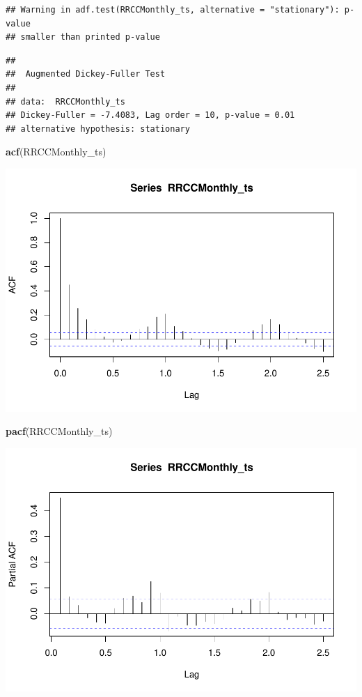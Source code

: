 \documentclass[12pt,]{article}
\newenvironment{Shaded}{\begin{snugshade}}{\end{snugshade}}
\newcommand{\KeywordTok}[1]{\textcolor[rgb]{0.13,0.29,0.53}{\textbf{#1}}}
\newcommand{\NormalTok}[1]{#1}
\begin{document}
\begin{verbatim}
## Warning in adf.test(RRCCMonthly_ts, alternative = "stationary"): p-value
## smaller than printed p-value
\end{verbatim}

\begin{verbatim}
## 
##  Augmented Dickey-Fuller Test
## 
## data:  RRCCMonthly_ts
## Dickey-Fuller = -7.4083, Lag order = 10, p-value = 0.01
## alternative hypothesis: stationary
\end{verbatim}

\begin{Shaded}
\begin{Highlighting}[]
\KeywordTok{acf}\NormalTok{(RRCCMonthly_ts)}
\end{Highlighting}
\end{Shaded}

\includegraphics{Project_Template_files/figure-latex/unnamed-chunk-6-23.pdf}

\begin{Shaded}
\begin{Highlighting}[]
\KeywordTok{pacf}\NormalTok{(RRCCMonthly_ts)}
\end{Highlighting}
\end{Shaded}

\includegraphics{Project_Template_files/figure-latex/unnamed-chunk-6-24.pdf}
\end{document}
